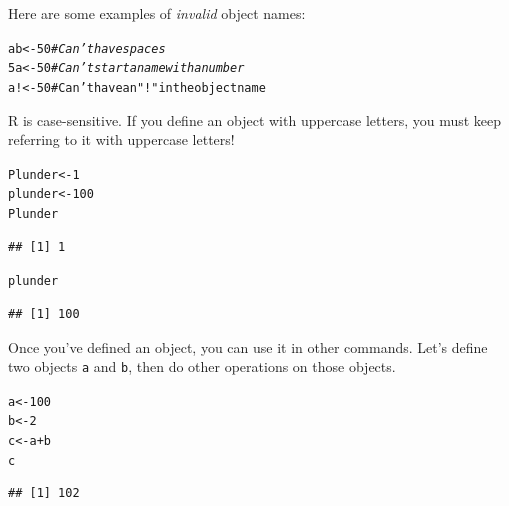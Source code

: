 \documentclass{tufte-book}\usepackage[]{graphicx}\usepackage[]{color}
\makeatletter
\newcommand{\hlnum}[1]{\textcolor[rgb]{0.686,0.059,0.569}{#1}}%
\newcommand{\hlstr}[1]{\textcolor[rgb]{0.192,0.494,0.8}{#1}}%
\newcommand{\hlcom}[1]{\textcolor[rgb]{0.678,0.584,0.686}{\textit{#1}}}%
\newcommand{\hlopt}[1]{\textcolor[rgb]{0,0,0}{#1}}%
\newcommand{\hlstd}[1]{\textcolor[rgb]{0.345,0.345,0.345}{#1}}%
\newcommand{\hlkwb}[1]{\textcolor[rgb]{0.69,0.353,0.396}{#1}}%
\newenvironment{kframe}{%
 \def\at@end@of@kframe{}%
 \ifinner\ifhmode%
  \def\at@end@of@kframe{\end{minipage}}%
  \begin{minipage}{\columnwidth}%
 \fi\fi%
 \def\FrameCommand##1{\hskip\@totalleftmargin \hskip-\fboxsep
 \colorbox{shadecolor}{##1}\hskip-\fboxsep
     \hskip-\linewidth \hskip-\@totalleftmargin \hskip\columnwidth}%
 \MakeFramed {\advance\hsize-\width
   \@totalleftmargin\z@ \linewidth\hsize
   \@setminipage}}%
 {\par\unskip\endMakeFramed%
 \at@end@of@kframe}
\newenvironment{knitrout}{}{} %
\makeatother
\begin{document}
Here are some examples of \textit{invalid} object names:


\begin{knitrout}
\color{fgcolor}\begin{kframe}
\begin{alltt}
a b <- 50 \hlcom{# Can't have spaces}
5a <- 50 \hlcom{# Can't start a name with a number}
a! <- 5 0# Can't have an \hlstr{"!"} in the object name
\end{alltt}
\end{kframe}
\end{knitrout}

R is case-sensitive. If you define an object with uppercase letters, you must keep referring to it with uppercase letters!



\begin{knitrout}
\color{fgcolor}\begin{kframe}
\begin{alltt}
\hlstd{Plunder} \hlkwb{<-} \hlnum{1}
\hlstd{plunder} \hlkwb{<-} \hlnum{100}
\hlstd{Plunder}
\end{alltt}
\begin{verbatim}
## [1] 1
\end{verbatim}
\begin{alltt}
\hlstd{plunder}
\end{alltt}
\begin{verbatim}
## [1] 100
\end{verbatim}
\end{kframe}
\end{knitrout}

Once you've defined an object, you can use it in other commands. Let's define two objects \texttt{a} and \texttt{b}, then do other operations on those objects.

\begin{knitrout}
\color{fgcolor}\begin{kframe}
\begin{alltt}
\hlstd{a} \hlkwb{<-} \hlnum{100}
\hlstd{b} \hlkwb{<-} \hlnum{2}
\hlstd{c} \hlkwb{<-} \hlstd{a} \hlopt{+} \hlstd{b}
\hlstd{c}
\end{alltt}
\begin{verbatim}
## [1] 102
\end{verbatim}
\end{kframe}
\end{knitrout}
\end{document}
